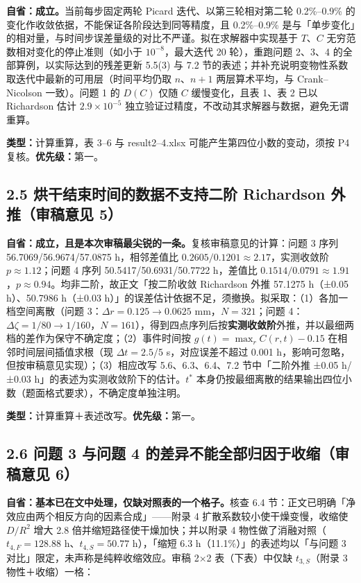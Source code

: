 \documentclass[12pt,a4paper]{ctexart}
\begin{document}
\textbf{自省：成立。}当前每步固定两轮 Picard 迭代、以第三轮相对第二轮 0.2\%--0.9\% 的变化作收敛依据，不能保证各阶段达到同等精度，且 0.2\%--0.9\% 是与「单步变化」的相对量，与时间步误差量级的对比不严谨。拟在求解器中实现基于 $T$、$C$ 无穷范数相对变化的停止准则（如小于 $10^{-8}$，最大迭代 20 轮），重跑问题 2、3、4 的全部算例，以实际达到的残差更新 5.5(3) 与 7.2 节的表述；并补充说明变物性系数取迭代中最新的可用层（时间平均仍取 $n$、$n+1$ 两层算术平均，与 Crank--Nicolson 一致）。问题 1 的 $D(C)$ 仅随 $C$ 缓慢变化，且表 1、表 2 已以 Richardson 估计 $2.9\times10^{-5}$ 独立验证过精度，不改动其求解器与数据，避免无谓重算。

\textbf{类型：}计算重算，表 3--6 与 result2--4.xlsx 可能产生第四位小数的变动，须按 P4 复核。\textbf{优先级：}第一。

\subsection{2.5 烘干结束时间的数据不支持二阶 Richardson 外推（审稿意见 5）}

\textbf{自省：成立，且是本次审稿最尖锐的一条。}复核审稿意见的计算：问题 3 序列 56.7069/56.9674/57.0875 h，相邻差值比 $0.2605/0.1201\approx2.17$，实测收敛阶 $p\approx1.12$；问题 4 序列 50.5417/50.6931/50.7722 h，差值比 $0.1514/0.0791\approx1.91$，$p\approx0.94$。均非二阶，故正文「按二阶收敛 Richardson 外推 57.1275 h（±0.05 h）、50.7986 h（±0.03 h）」的误差估计依据不足，须撤换。拟采取：（1）各加一档空间离散（问题 3：$\Delta r=0.125\to0.0625$ mm，$N=321$；问题 4：$\Delta\zeta=1/80\to1/160$，$N=161$），得到四点序列后按\textbf{实测收敛阶}外推，并以最细两档的差作为保守不确定度；（2）事件时间按 $g(t)=\max_r C(r,t)-0.15$ 在相邻时间层间插值求根（现 $\Delta t=2.5$/5 s，对应误差不超过 0.001 h，影响可忽略，但按审稿意见实现）；（3）相应改写 5.6、6.3、6.4、7.2 节中「二阶外推 ±0.05 h/±0.03 h」的表述为实测收敛阶下的估计。$t^*$ 本身仍按最细离散的结果输出四位小数（题面格式要求），不确定度单独注明。

\textbf{类型：}计算重算＋表述改写。\textbf{优先级：}第一。

\subsection{2.6 问题 3 与问题 4 的差异不能全部归因于收缩（审稿意见 6）}

\textbf{自省：基本已在文中处理，仅缺对照表的一个格子。}核查 6.4 节：正文已明确「净效应由两个相反方向的因素合成」——附录 4 扩散系数较小使干燥变慢，收缩使 $D/R^2$ 增大 2.8 倍并缩短路径使干燥加快；并以附录 4 物性做了消融对照（$t_{4,F}=128.88$ h、$t_{4,S}=50.77$ h），「缩短 6.3 h（11.1\%）」的表述均以「与问题 3 对比」限定，未声称是纯粹收缩效应。审稿 2×2 表（下表）中仅缺 $t_{3,S}$（附录 3 物性＋收缩）一格：
\end{document}
